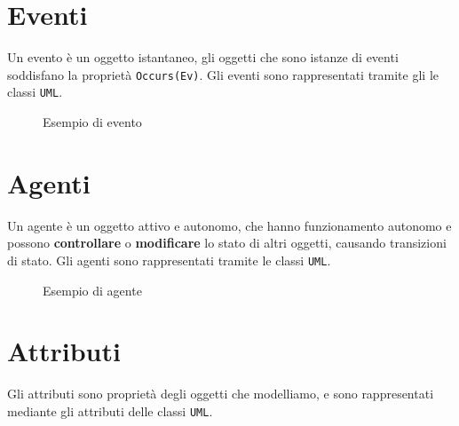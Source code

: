 \section{Eventi}
\begin{tcolorbox}[colback=cyan!5!white,colframe=cyan!75!black, title=Eventi]
    Un evento è un oggetto istantaneo, gli oggetti che sono istanze di eventi soddisfano 
    la proprietà \texttt{Occurs(Ev)}. Gli eventi sono rappresentati tramite gli 
    le classi \texttt{UML}.
\end{tcolorbox}
\begin{figure}[H]
    \centering
    \caption{Esempio di evento}
\end{figure}
\section{Agenti}
\begin{tcolorbox}[colback=gray!5!white,colframe=gray!75!black, title=Agenti]
    Un agente è un oggetto attivo e autonomo, che hanno funzionamento autonomo e
    possono \textbf{controllare} o \textbf{modificare} lo stato di altri oggetti, 
    causando transizioni di stato. Gli agenti sono rappresentati tramite
    le classi \texttt{UML}.
\end{tcolorbox}
\begin{figure}[H]
    \centering
    \caption{Esempio di agente}
\end{figure}
\section{Attributi}
\begin{tcolorbox}[colback=yellow!5!white,colframe=yellow!75!black, title=Attributi]
    Gli attributi sono proprietà degli oggetti che modelliamo, e sono rappresentati 
    mediante gli attributi delle classi \texttt{UML}.
\end{tcolorbox}

